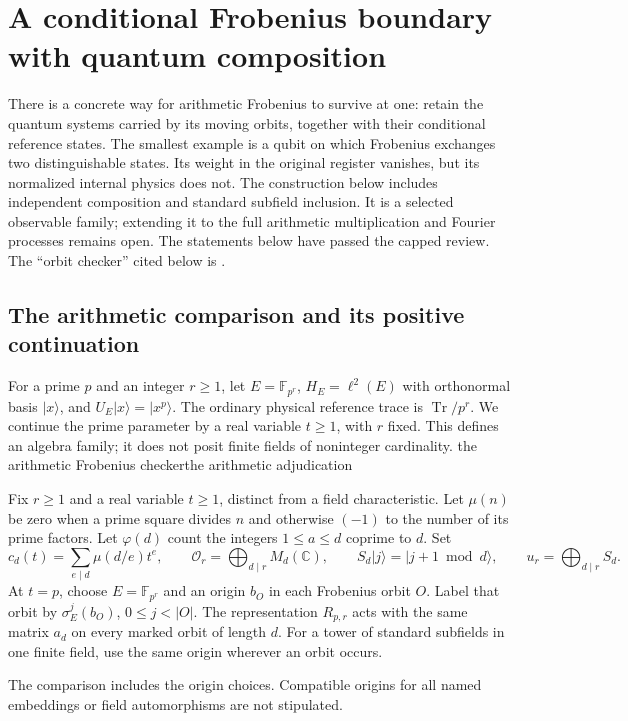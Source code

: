\section{A conditional Frobenius boundary with quantum composition}
\label{sec:frobenius-boundary}

There is a concrete way for arithmetic Frobenius to survive at one:
retain the quantum systems carried by its moving orbits, together with
their conditional reference states. The smallest example is a qubit on
which Frobenius exchanges two distinguishable states. Its weight in the
original register vanishes, but its normalized internal physics does not.
The construction below includes independent composition and standard
subfield inclusion. It is a selected observable family; extending it to
the full arithmetic multiplication and Fourier processes remains open.
The statements below have passed the capped review.
The ``orbit checker'' cited below is
.

\subsection{The arithmetic comparison and its positive continuation}

For a prime $p$ and an integer $r\geq1$, let $E=\mathbb F_{p^r}$,
$H_E=\ell^2(E)$ with orthonormal basis $|x\rangle$, and
$U_E|x\rangle=|x^p\rangle$. The ordinary physical reference trace is
$\operatorname{Tr}/p^r$. We continue the prime parameter by a real variable
$t\geq1$, with $r$ fixed. This defines an algebra family; it does not posit
finite fields of noninteger cardinality.
{the arithmetic Frobenius checker}{the arithmetic adjudication}

\begin{definition}
Fix $r\geq1$ and a real variable $t\geq1$, distinct from a field
characteristic. Let $\mu(n)$ be zero when a prime square divides $n$ and
otherwise $(-1)$ to the number of its prime factors. Let $\varphi(d)$ count
the integers $1\leq a\leq d$ coprime to $d$. Set
\[
 c_d(t)=\sum_{e\mid d}\mu(d/e)t^e,\qquad
 \mathcal O_r=\bigoplus_{d\mid r}M_d(\mathbb C),\qquad
 S_d|j\rangle=|j+1\bmod d\rangle,\qquad
 u_r=\bigoplus_{d\mid r}S_d.
\]
At $t=p$, choose $E=\mathbb F_{p^r}$ and an origin $b_O$ in each
Frobenius orbit $O$. Label that orbit by $\sigma_E^j(b_O)$,
$0\leq j<|O|$. The representation $R_{p,r}$ acts with the same matrix
$a_d$ on every marked orbit of length $d$. For a tower of standard
subfields in one finite field, use the same origin wherever an orbit occurs.
\end{definition}
\begin{scope}
The comparison includes the origin choices. Compatible origins for all
named embeddings or field automorphisms are not stipulated.
\end{scope}

